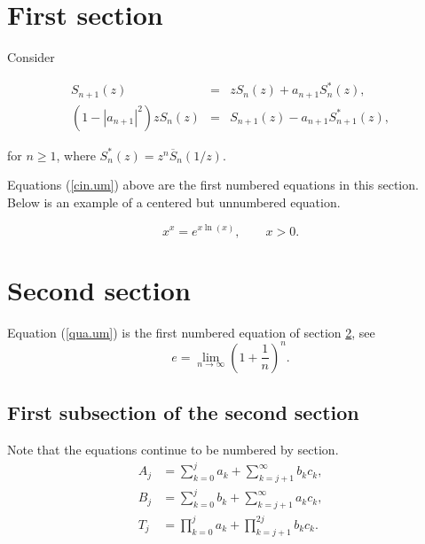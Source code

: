 \documentclass[english]{TCAM} %
\begin{document}
\begin{framed}
\begin{minipage}{12cm}

\setcounter{section}{0}
\section{First section}
\label{cin} Consider

\begin{equation} \label{cin.um}
\begin{array}{rcl}
S_{n+1}(z) & = & z S_{n}(z) +
a_{n+1} S_{n}^{*}(z), \\ [1ex]
\left(1-|a_{n+1}|^2\right) z S_{n}(z) & = &
S_{n+1}(z) - a_{n+1} S_{n+1}^{*}(z),
\end{array}
\end{equation}

for $n \geq 1$, where $S_n^{*}(z) = z^n \overline{S}_n(1/z)$.

Equations (\ref{cin.um}) above are the first numbered equations
in this section. Below is an example of a centered but unnumbered equation.

\[ x^x = e^{x \ln(x)}, \qquad x > 0. \]

\section{Second section}
\label{qua}

Equation (\ref{qua.um}) is the first numbered equation of section
\ref{qua}, see
\begin{equation} \label{qua.um}
e = \lim_{n\rightarrow\infty} \left( 1+\frac{1}{n}\right)^n.
\end{equation}

\subsection{First subsection of the second section}

Note that the equations continue to be numbered by section.
\begin{align} \label{qua.dois}
A_{j} &=\sum_{k=0}^j a_k +\sum_{k=j+1}^{\infty} b_k c_k, \\
B_{j} &=\sum_{k=0}^j b_k +\sum_{k=j+1}^{\infty} a_k c_k,\\
T_{j} &=\prod_{k=0}^j a_k+\prod_{k=j+1}^{2j} b_k c_k.\nonumber
\end{align}

\end{minipage}
\end{framed}
\end{document}
